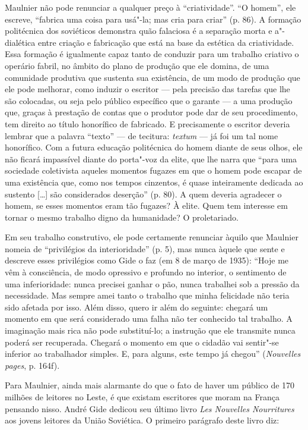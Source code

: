 Maulnier não pode renunciar a qualquer preço à ``criatividade''. ``O
homem'', ele escreve, ``fabrica uma coisa para usá"-la; mas cria para
criar'' (p. 86). A formação politécnica dos soviéticos demonstra quão falaciosa é a separação morta e a"-dialética entre
criação e fabricação que está na base da estética da criatividade.
Essa formação é
igualmente capaz tanto de conduzir para um trabalho criativo o operário
fabril, no âmbito do plano de produção que ele domina, de uma comunidade
produtiva que sustenta sua existência, de um modo de produção que ele
pode melhorar, como induzir o escritor --- pela precisão das tarefas que
lhe são colocadas, ou seja pelo público específico que o garante --- a
uma produção que, graças à prestação de contas que o produtor pode dar
de seu procedimento, tem direito ao título honorífico de fabricado. E
precisamente o escritor deveria lembrar que a palavra ``texto'' --- de
tecitura: \emph{textum} --- já foi um tal nome honorífico. Com a futura
educação politécnica do homem diante de seus olhos, ele não ficará
impassível diante do porta"-voz da elite, que lhe narra que ``para uma
sociedade coletivista aqueles momentos fugazes em que o homem pode
escapar de uma existência que, como nos tempos cinzentos, é quase
inteiramente dedicada ao sustento {[}\ldots{}{]} são considerados deserção''
(p. 80). A quem deveria agradecer o homem, se esses momentos eram tão
fugazes? À elite. Quem tem interesse em tornar o mesmo trabalho digno da
humanidade? O proletariado.

Em seu trabalho construtivo, ele pode certamente renunciar àquilo que
Maulnier nomeia de ``privilégios da interioridade'' (p. 5), mas nunca
àquele que sente e descreve esses privilégios como Gide o faz (em 8 de
março de 1935): ``Hoje me vêm à consciência, de modo opressivo e
profundo no interior, o sentimento de uma inferioridade: nunca precisei
ganhar o pão, nunca trabalhei sob a pressão da necessidade. Mas sempre
amei tanto o trabalho que minha felicidade não teria sido afetada por
isso. Além disso, quero ir além do seguinte: chegará um momento em que
será considerado uma falha não ter conhecido tal trabalho. A imaginação
mais rica não pode substituí-lo; a instrução que ele transmite nunca
poderá ser recuperada. Chegará o momento em que o cidadão vai sentir"-se
inferior ao trabalhador simples. E, para alguns, este tempo já chegou''
(\emph{Nouvelles pages}, p. 164f).

Para Maulnier, ainda mais alarmante do que o fato de haver um público de
170 milhões de leitores no Leste, é que existam escritores que moram na
França pensando nisso. André Gide dedicou seu último livro \emph{Les
Nouvelles Nourritures} aos jovens leitores da União Soviética. O
primeiro parágrafo deste livro diz:

